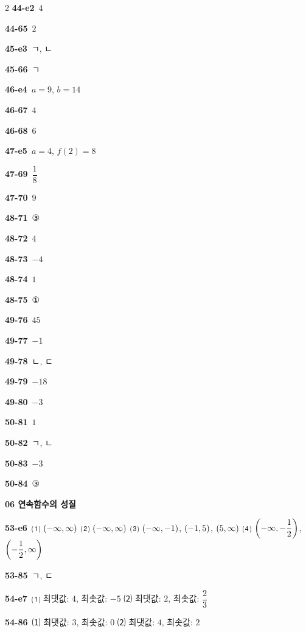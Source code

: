 \documentclass[10pt,a4paper]{article}
\begin{document}
\begin{multicols}{2}
\noindent\textbf{44-e2}\ $4$\par
\noindent\textbf{44-65}\ $2$\par
\noindent\textbf{45-e3}\ ㄱ, ㄴ\par
\noindent\textbf{45-66}\ ㄱ\par
\noindent\textbf{46-e4}\ $a=9$, $b=14$\par
\noindent\textbf{46-67}\ $4$\par
\noindent\textbf{46-68}\ $6$\par
\noindent\textbf{47-e5}\ $a=4$, $f(2)=8$\par
\noindent\textbf{47-69}\ $\dfrac{1}{8}$\par
\noindent\textbf{47-70}\ $9$\par
\noindent\textbf{48-71}\ ③\par
\noindent\textbf{48-72}\ $4$\par
\noindent\textbf{48-73}\ $-4$\par
\noindent\textbf{48-74}\ $1$\par
\noindent\textbf{48-75}\ ①\par
\noindent\textbf{49-76}\ $45$\par
\noindent\textbf{49-77}\ $-1$\par
\noindent\textbf{49-78}\ ㄴ, ㄷ\par
\noindent\textbf{49-79}\ $-18$\par
\noindent\textbf{49-80}\ $-3$\par
\noindent\textbf{50-81}\ $1$\par
\noindent\textbf{50-82}\ ㄱ, ㄴ\par
\noindent\textbf{50-83}\ $-3$\par
\noindent\textbf{50-84}\ ③\par
\noindent\textbf{06 연속함수의 성질}\par\smallskip
\noindent\textbf{53-e6}\ ⑴ $(-\infty{,}\mkern3mu\mathopen{}\infty)$ ⑵ $(-\infty{,}\mkern3mu\mathopen{}\infty)$ ⑶ $(-\infty{,}\mkern3mu\mathopen{}-1)$, $(-1{,}\mkern3mu\mathopen{}5)$, $(5{,}\mkern3mu\mathopen{}\infty)$ ⑷ $\left(-\infty{,}\mkern3mu\mathopen{}-\dfrac{1}{2}\right)$, $\left(-\dfrac{1}{2}{,}\mkern3mu\mathopen{}\infty\right)$\par
\noindent\textbf{53-85}\ ㄱ, ㄷ\par
\noindent\textbf{54-e7}\ ⑴ 최댓값: $4$, 최솟값: $-5$ ⑵ 최댓값: $2$, 최솟값: $\dfrac{2}{3}$\par
\noindent\textbf{54-86}\ ⑴ 최댓값: $3$, 최솟값: $0$ ⑵ 최댓값: $4$, 최솟값: $2$\par

\end{multicols}
\end{document}

